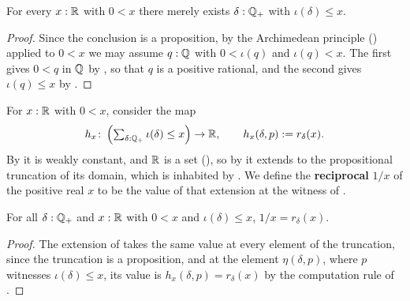 \begin{lemma}
  \label{posExistsRatLeReal}
  For every $x : \mathbb{R}$ with $0 < x$ there merely exists $\delta : \mathbb{Q}_{+}$ with $\iota(\delta) \le x$.
\end{lemma}
\begin{proof}
  Since the conclusion is a proposition, by the Archimedean principle () applied to $0 < x$ we may assume $q : \mathbb{Q}$ with $0 < \iota(q)$ and $\iota(q) < x$. The first gives $0 < q$ in $\mathbb{Q}$ by , so that $q$ is a positive rational, and the second gives $\iota(q) \le x$ by .
\end{proof}

\begin{definition}
  \label{recip}
  For $x : \mathbb{R}$ with $0 < x$, consider the map
  \[
    h_x \colon \left(\textstyle\sum_{\delta : \mathbb{Q}_{+}} \iota(\delta) \le x\right) \to \mathbb{R}, \qquad h_x(\delta, p) := r_\delta(x).
  \]
  By  it is weakly constant, and $\mathbb{R}$ is a set (), so by  it extends to the propositional truncation of its domain, which is inhabited by . We define the \textbf{reciprocal} $1/x$ of the positive real $x$ to be the value of that extension at the witness of .
\end{definition}

\begin{lemma}
  \label{recipEqBoundedRecip}
  For all $\delta : \mathbb{Q}_{+}$ and $x : \mathbb{R}$ with $0 < x$ and $\iota(\delta) \le x$, $1/x = r_\delta(x)$.
\end{lemma}
\begin{proof}
  The extension of  takes the same value at every element of the truncation, since the truncation is a proposition, and at the element $\eta(\delta, p)$, where $p$ witnesses $\iota(\delta) \le x$, its value is $h_x(\delta, p) = r_\delta(x)$ by the computation rule of .
\end{proof}

